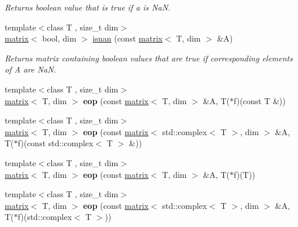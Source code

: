 \begin{DoxyCompactItemize}
\begin{DoxyCompactList}\small\item\em Returns boolean value that is true if a is Na\-N. \end{DoxyCompactList}\item 
\hypertarget{namespacekeycpp_a7e322f9a9b9a2bd3446ecaffbcea88cb}{{\footnotesize template$<$class T , size\-\_\-t dim$>$ }\\\hyperlink{classkeycpp_1_1matrix}{matrix}$<$ bool, dim $>$ \hyperlink{namespacekeycpp_a7e322f9a9b9a2bd3446ecaffbcea88cb}{isnan} (const \hyperlink{classkeycpp_1_1matrix}{matrix}$<$ T, dim $>$ \&A)}\label{namespacekeycpp_a7e322f9a9b9a2bd3446ecaffbcea88cb}

\begin{DoxyCompactList}\small\item\em Returns matrix containing boolean values that are true if corresponding elements of A are Na\-N. \end{DoxyCompactList}\item 
\hypertarget{namespacekeycpp_ac999bd518fb456aa9a4fbd2c04f007de}{{\footnotesize template$<$class T , size\-\_\-t dim$>$ }\\\hyperlink{classkeycpp_1_1matrix}{matrix}$<$ T, dim $>$ {\bfseries eop} (const \hyperlink{classkeycpp_1_1matrix}{matrix}$<$ T, dim $>$ \&A, T($\ast$f)(const T \&))}\label{namespacekeycpp_ac999bd518fb456aa9a4fbd2c04f007de}

\item 
\hypertarget{namespacekeycpp_a0865e2c884915d6ed0e3ef7bf73438b0}{{\footnotesize template$<$class T , size\-\_\-t dim$>$ }\\\hyperlink{classkeycpp_1_1matrix}{matrix}$<$ T, dim $>$ {\bfseries eop} (const \hyperlink{classkeycpp_1_1matrix}{matrix}$<$ std\-::complex$<$ T $>$, dim $>$ \&A, T($\ast$f)(const std\-::complex$<$ T $>$ \&))}\label{namespacekeycpp_a0865e2c884915d6ed0e3ef7bf73438b0}

\item 
\hypertarget{namespacekeycpp_a46e135aeca12d58b9a084413bf571783}{{\footnotesize template$<$class T , size\-\_\-t dim$>$ }\\\hyperlink{classkeycpp_1_1matrix}{matrix}$<$ T, dim $>$ {\bfseries eop} (const \hyperlink{classkeycpp_1_1matrix}{matrix}$<$ T, dim $>$ \&A, T($\ast$f)(T))}\label{namespacekeycpp_a46e135aeca12d58b9a084413bf571783}

\item 
\hypertarget{namespacekeycpp_a2309a6456fab18ec68a436f269d32d8f}{{\footnotesize template$<$class T , size\-\_\-t dim$>$ }\\\hyperlink{classkeycpp_1_1matrix}{matrix}$<$ T, dim $>$ {\bfseries eop} (const \hyperlink{classkeycpp_1_1matrix}{matrix}$<$ std\-::complex$<$ T $>$, dim $>$ \&A, T($\ast$f)(std\-::complex$<$ T $>$))}\label{namespacekeycpp_a2309a6456fab18ec68a436f269d32d8f}


\end{DoxyCompactItemize}
